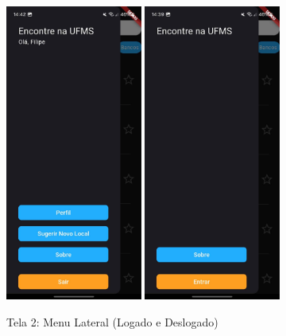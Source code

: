     \begin{figure}[h]
        \centering
        \includegraphics[width=0.4\textwidth]{imagens/menu-lateral-logado.jpg}
        \hspace{10mm}
        \includegraphics[width=0.4\textwidth]{imagens/menu-lateral-logout.jpg}
        \caption{\scriptsize Tela 2: Menu Lateral (Logado e Deslogado)}
        \label{fig:tela2-logado}
    \end{figure}

